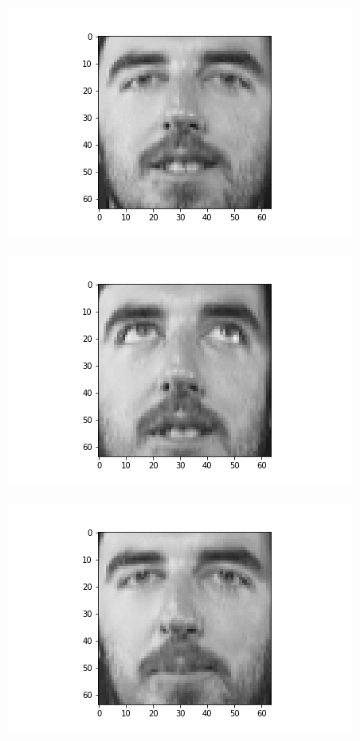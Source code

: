 \documentclass[12pt, a4paper]{article}
\begin{document}
\begin{figure}[h]
\begin{subfigure}{0.3\linewidth}
    \end{subfigure}
    \newline
    \begin{subfigure}{0.3\linewidth}
        \centering
        \includegraphics[width=\linewidth]{images/q3/c/9/3.png}
    \end{subfigure}
    \hfill
    \begin{subfigure}{0.3\linewidth}
        \centering
        \includegraphics[width=\linewidth]{images/q3/c/9/4.png}
    \end{subfigure}
    \hfill
    \begin{subfigure}{0.3\linewidth}
        \centering
        \includegraphics[width=\linewidth]{images/q3/c/9/5.png}

\end{subfigure}
\end{figure}
\end{document}

